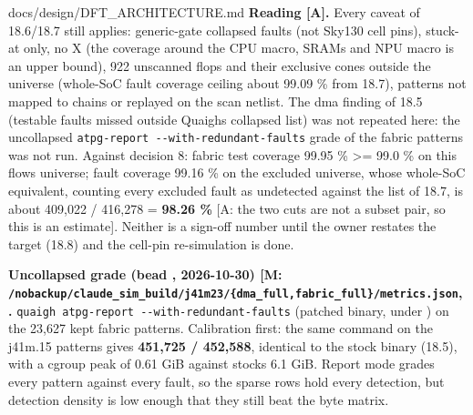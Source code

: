 \begin{relocated}{docs/design/DFT_ARCHITECTURE.md}
\textbf{Reading {[}A{]}.} Every caveat of 18.6/18.7 still applies:
generic-gate collapsed faults (not Sky130 cell pins), stuck-at only, no
X (the coverage around the CPU macro, SRAMs and NPU macro is an upper
bound), 922 unscanned flops and their exclusive cones outside the
universe (whole-SoC fault coverage ceiling about 99.09 \% from 18.7),
patterns not mapped to chains or replayed on the scan netlist. The dma
finding of 18.5 (testable faults missed outside Quaigh\textquotesingle s
collapsed list) was not repeated here: the uncollapsed
\texttt{atpg-\allowbreak{}report\ -\allowbreak{}-\allowbreak{}with-\allowbreak{}redundant-\allowbreak{}faults}
grade of the fabric patterns was not run. Against decision 8: fabric
test coverage 99.95 \% \textgreater= 99.0 \% on this
flow\textquotesingle s universe; fault coverage 99.16 \% on the excluded
universe, whose whole-SoC equivalent, counting every excluded fault as
undetected against the  list of 18.7, is about
409,022 / 416,278 = \textbf{98.26 \%} {[}A: the two cuts are not a
subset pair, so this is an estimate{]}. Neither is a sign-off number
until the owner restates the target (18.8) and the cell-pin
re-simulation is done.

\textbf{Uncollapsed grade (bead , 2026-10-30) {[}M:
\texttt{/\allowbreak{}nobackup/\allowbreak{}claude\_\allowbreak{}sim\_\allowbreak{}build/\allowbreak{}j41m23/\allowbreak{}\{dma\_\allowbreak{}full,\allowbreak{}fabric\_\allowbreak{}full\}/\allowbreak{}metrics.\allowbreak{}json},
\code{run.log}{]}.}
\texttt{quaigh\ atpg-\allowbreak{}report\ -\allowbreak{}-\allowbreak{}with-\allowbreak{}redundant-\allowbreak{}faults}
(patched binary, under ) on the 23,627 kept fabric
patterns. Calibration first: the same command on the j41m.15 
patterns gives \textbf{451,725 / 452,588}, identical to the stock binary
(18.5), with a cgroup peak of 0.61 GiB against stock\textquotesingle s
6.1 GiB. Report mode grades every pattern against every fault, so the
sparse rows hold every detection, but detection density is low enough
that they still beat the byte matrix.

\begin{landscape}
\small\setlength{\tabcolsep}{4pt}


\end{landscape}
\end{relocated}
